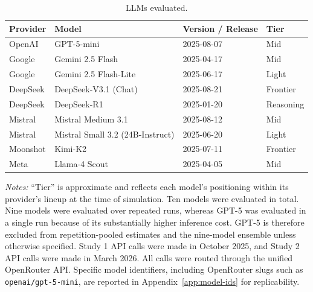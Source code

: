 % 
%
\begin{table}[h]
    \centering
    \caption{LLMs evaluated.}
    \label{tab:models}
    \begin{threeparttable}
        \begin{tabular}{llll}
            \toprule
            Provider & Model & Version / Release & Tier \\
            \midrule
            OpenAI
                & GPT-5-mini
                & 2025-08-07
                & Mid \\
            Google
                & Gemini 2.5 Flash
                & 2025-04-17
                & Mid \\
            Google
                & Gemini 2.5 Flash-Lite
                & 2025-06-17
                & Light \\
            DeepSeek
                & DeepSeek-V3.1 (Chat)
                & 2025-08-21
                & Frontier \\
            DeepSeek
                & DeepSeek-R1
                & 2025-01-20
                & Reasoning \\
            Mistral
                & Mistral Medium 3.1
                & 2025-08-12
                & Mid \\
            Mistral
                & Mistral Small 3.2 (24B-Instruct)
                & 2025-06-20
                & Light \\
            Moonshot
                & Kimi-K2
                & 2025-07-11
                & Frontier \\
            Meta
                & Llama-4 Scout
                & 2025-04-05
                & Mid \\
            \bottomrule
        \end{tabular}
        \begin{tablenotes}\footnotesize
            \item \textit{Notes:}
            ``Tier'' is approximate and reflects each model's positioning
            within its provider's lineup at the time of simulation. Ten
            models were evaluated in total. Nine models were evaluated over
            repeated runs, whereas GPT-5 was evaluated in a single run
            because of its substantially higher inference cost. GPT-5 is
            therefore excluded from repetition-pooled estimates and the
            nine-model ensemble unless otherwise specified. Study 1 API
            calls were made in October 2025, and Study 2 API calls were made
            in March 2026. All calls were routed through the unified
            OpenRouter API. Specific model identifiers, including OpenRouter
            slugs such as \texttt{openai/gpt-5-mini}, are reported in
            Appendix~\ref{app:model-ids} for replicability.
        \end{tablenotes}
    \end{threeparttable}
\end{table}